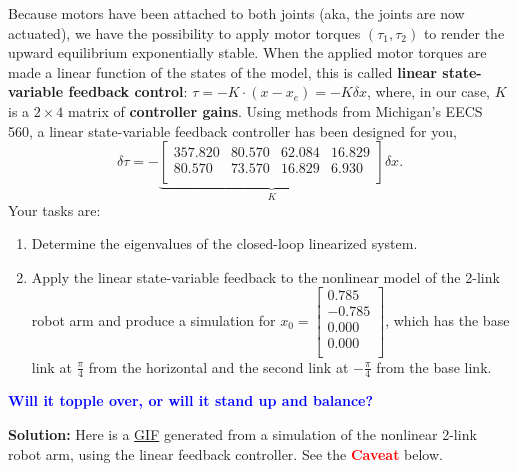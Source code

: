 \begin{example}
Because motors have been attached to both joints (aka, the joints are now actuated), we have the possibility to apply motor torques $(\tau_1, \tau_2)$ to render the upward equilibrium exponentially stable. When the applied motor torques are made a linear function of the states of the model, this is called \textbf{linear state-variable feedback control}: $\tau = -K \cdot (x - x_e) = -K \delta x$,
where, in our case, $K$ is a $2 \times 4$ matrix of \textbf{controller gains}. Using methods from Michigan's EECS 560, a linear state-variable feedback controller has been designed for you,
\begin{equation}
\delta \tau = - \underbrace{\left[
\begin{array}{rrrr}
357.820 & 80.570 & 62.084 & 16.829 \\
80.570 & 73.570 & 16.829 & 6.930 \\
\end{array}
\right]}_{K} \delta x.
\end{equation}
Your tasks are:

\begin{enumerate}
\renewcommand{\labelenumi}{(\alph{enumi})}
\setlength{\itemsep}{.2cm}
\item Determine the eigenvalues of the closed-loop linearized system.
\item Apply the linear state-variable feedback to the nonlinear model of the 2-link robot arm and produce a simulation for 
$x_0 = 
\left[
\begin{array}{r}
0.785 \\
-0.785 \\
0.000 \\
0.000 \\
\end{array}
\right]
$, which has the base link at $\frac{\pi}{4}$ from the horizontal and the second link at $-\frac{\pi}{4}$ from the base link.
\end{enumerate}
\textcolor{blue}{\bf Will it topple over, or will it stand up and balance?} 

\end{example}
\textbf{Solution:} \Ans Here is a \href{https://www.dropbox.com/scl/fi/bnci6n1rkczpwj241nyw2/inverted2LinkRobotArm.gif?rlkey=do5u9duymxhdzekj4q4xejd8y&dl=0}{GIF} generated from a simulation of the nonlinear 2-link robot arm, using the linear feedback controller. See the \textcolor{red}{\bf Caveat} below. 

